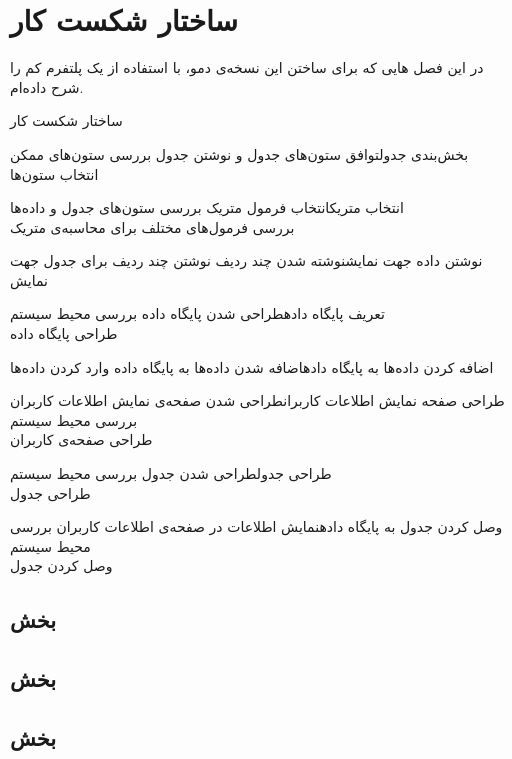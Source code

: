 \chapter{ساختار شکست کار}
در این فصل 
هایی
که برای ساختن این نسخه‌ی دمو، با استفاده از یک پلتفرم کم را شرح داده‌ام.

\begin{wbsbox}{ساختار شکست کار}
\begin{wbssub}{بخش‌بندی جدول}{توافق ستون‌های جدول و نوشتن جدول}
\task بررسی ستون‌های ممکن \\
\task انتخاب ستون‌ها
\end{wbssub}

\begin{wbssub}{انتخاب متریک}{انتخاب فرمول متریک}
\task بررسی ستون‌های جدول و داده‌ها\\
\task بررسی فرمول‌های مختلف ‌برای محاسبه‌ی متریک
\end{wbssub}

\begin{wbssub}{نوشتن داده جهت نمایش}{نوشته شدن چند ردیف}
\task نوشتن چند ردیف برای جدول جهت نمایش
\end{wbssub}

\begin{wbssub}{تعریف پایگاه داده}{طراحی شدن پایگاه داده}
\task بررسی محیط سیستم  \\
\task طراحی پایگاه داده
\end{wbssub}

\begin{wbssub}{اضافه کردن داده‌ها به پایگاه داده}{اضافه شدن داده‌ها به پایگاه داده}
\task وارد کردن داده‌ها
\end{wbssub}

\begin{wbssub}{طراحی صفحه نمایش اطلاعات کاربران}{طراحی شدن صفحه‌ی نمایش اطلاعات کاربران}
\task بررسی محیط سیستم  \\
\task طراحی صفحه‌ی کاربران
\end{wbssub}

\begin{wbssub}{طراحی جدول}{طراحی شدن جدول}
\task بررسی محیط سیستم  \\
\task طراحی جدول
\end{wbssub}

\begin{wbssub}{وصل کردن جدول به پایگاه داده}{نمایش اطلاعات در صفحه‌ی اطلاعات کاربران}
\task بررسی محیط سیستم  \\
\task وصل کردن جدول
\end{wbssub}
\end{wbsbox}

\section{بخش }
\section{بخش }
\section{بخش }
